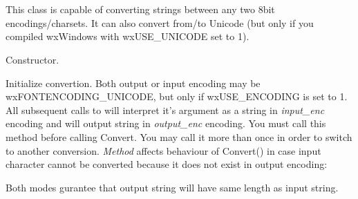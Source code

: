 %
%


\section{}\label{wxencodingconverter}

This class is capable of converting strings between any two
8bit encodings/charsets. It can also convert from/to Unicode (but only
if you compiled wxWindows with wxUSE_UNICODE set to 1).







\label{wxencodingconverterwxencodingconverter}


Constructor.

\label{wxencodingconverterinit}


Initialize convertion. Both output or input encoding may
be wxFONTENCODING\_UNICODE, but only if wxUSE\_ENCODING is set to 1.
All subsequent calls to  
will interpret it's argument
as a string in {\it input\_enc} encoding and will output string in
{\it output\_enc} encoding.
You must call this method before calling Convert. You may call 
it more than once in order to switch to another conversion.
{\it Method} affects behaviour of Convert() in case input character
cannot be converted because it does not exist in output encoding:

\begin{twocollist}
\end{twocollist}

Both modes gurantee that output string will have same length
as input string.

